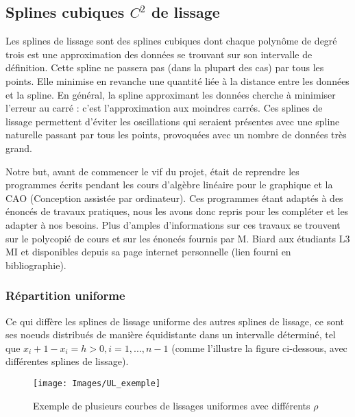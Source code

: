 \documentclass[a4paper,12pt]{article} %
\begin{document}
		\subsection{Splines cubiques $C^2$ de lissage}
		
		    
		
		    Les splines de lissage sont des splines cubiques dont chaque polynôme de degré trois est une approximation des données se trouvant sur son intervalle de définition. Cette spline ne passera pas (dans la plupart des cas)  par tous les points. Elle  minimise en revanche une quantité liée à la distance entre les données et la spline. En général, la spline approximant les données cherche à minimiser l'erreur au carré : c'est l'approximation aux moindres carrés.  Ces splines de lissage permettent d'éviter les oscillations qui seraient présentes avec une spline naturelle passant par tous les points, provoquées avec un nombre de données très grand. 
		    
		    Notre but, avant de commencer le vif du projet, était de reprendre les programmes écrits pendant les cours d'algèbre linéaire pour le graphique et la CAO (Conception assistée par ordinateur). Ces programmes étant adaptés à des énoncés de travaux pratiques, nous les avons donc repris pour les compléter et les adapter à nos besoins.  Plus d'amples d'informations sur ces travaux se trouvent sur le polycopié de cours et sur les énoncés fournis par M. Biard aux étudiants L3 MI et disponibles depuis sa page internet personnelle (lien fourni en bibliographie).
	        

			\subsubsection{Répartition uniforme}
			
                Ce qui diffère les splines de lissage uniforme des autres splines de lissage, ce sont ses noeuds distribués de manière équidistante dans un intervalle déterminé, tel que $x_i+1 - x_i = h > 0, i = 1,...,n-1$ (comme l'illustre la figure ci-dessous, avec différentes splines de lissage).
                \begin{figure}
                    \centering
                    \texttt{[image: Images/UL\_exemple]}
                    \caption{Exemple de plusieurs courbes de lissages uniformes avec différents  $\rho$  }
                    \label{fig:UL1}
                \end{figure}
                
\end{document}
